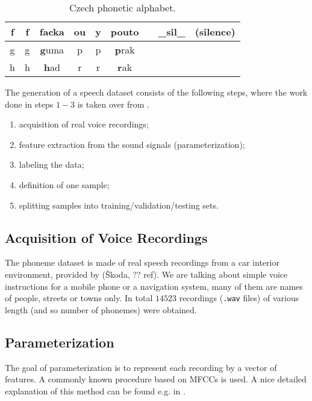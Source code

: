 \begin{table}[H]
{\begin{tabular}{|c|c|c||c|c|c||c|c|c|}
f  & f                & \textbf{f}acka            & ou & y                & p\textbf{ou}to            &       & \_sil\_          & (silence)                 \\ \hline
g  & g                & \textbf{g}uma             & p  & p                & \textbf{p}rak             &       &                  &                           \\ \hline
h  & h                & \textbf{h}ad              & r  & r                & \textbf{r}ak              &       &                  &                           \\ \hline
\end{tabular}}
\caption{Czech phonetic alphabet.}
\label{tab:methods:phonetic_alphabet}
\end{table}

The generation of a speech dataset consists of the following steps, where the work done in steps $ 1-3 $ is taken over from \citep{smidl_pc}.

\begin{enumerate}
\item acquisition of real voice recordings;
\item feature extraction from the sound signals (parameterization);
\item labeling the data;
\item definition of one sample;
\item splitting samples into training/validation/testing sets.
\end{enumerate}

\subsection*{Acquisition of Voice Recordings}
The phoneme dataset is made of real speech recordings from a car interior environment, provided by (Škoda, ?? ref). We are talking about simple voice instructions for a mobile phone or a navigation system, many of them are names of people, streets or towns only. In total $ 14523 $ recordings (\texttt{.wav} files) of various length (and so number of phonemes) were obtained.

\subsection*{Parameterization}
The goal of parameterization is to represent each recording by a vector of features. A commonly known procedure based on MFCCs is used. A nice detailed explanation of this method can be found e.g. in \citep{online:mfcc}. 


